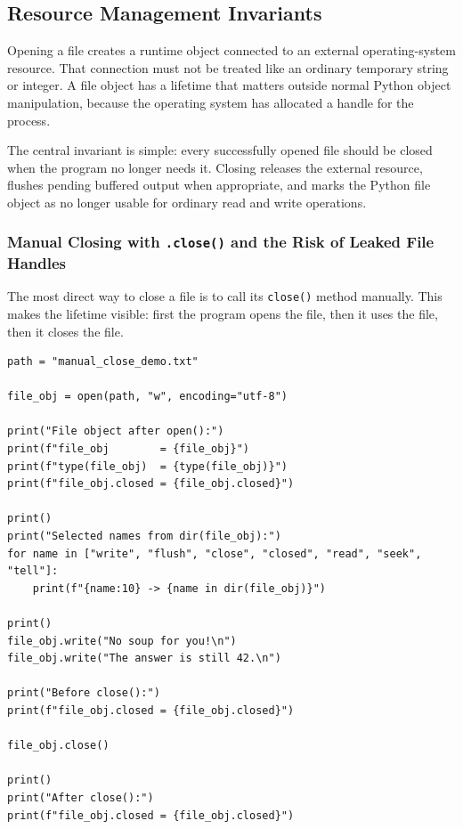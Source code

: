 \subsection{Resource Management Invariants}

Opening a file creates a runtime object connected to an external operating-system resource. That connection must not be treated like an ordinary temporary string or integer. A file object has a lifetime that matters outside normal Python object manipulation, because the operating system has allocated a handle for the process.

The central invariant is simple: every successfully opened file should be closed when the program no longer needs it. Closing releases the external resource, flushes pending buffered output when appropriate, and marks the Python file object as no longer usable for ordinary read and write operations.

\subsubsection{Manual Closing with \texttt{.close()} and the Risk of Leaked File Handles}

The most direct way to close a file is to call its \texttt{close()} method manually. This makes the lifetime visible: first the program opens the file, then it uses the file, then it closes the file.

\begin{verbatim}
path = "manual_close_demo.txt"

file_obj = open(path, "w", encoding="utf-8")

print("File object after open():")
print(f"file_obj        = {file_obj}")
print(f"type(file_obj)  = {type(file_obj)}")
print(f"file_obj.closed = {file_obj.closed}")

print()
print("Selected names from dir(file_obj):")
for name in ["write", "flush", "close", "closed", "read", "seek", "tell"]:
    print(f"{name:10} -> {name in dir(file_obj)}")

print()
file_obj.write("No soup for you!\n")
file_obj.write("The answer is still 42.\n")

print("Before close():")
print(f"file_obj.closed = {file_obj.closed}")

file_obj.close()

print()
print("After close():")
print(f"file_obj.closed = {file_obj.closed}")
\end{verbatim}

